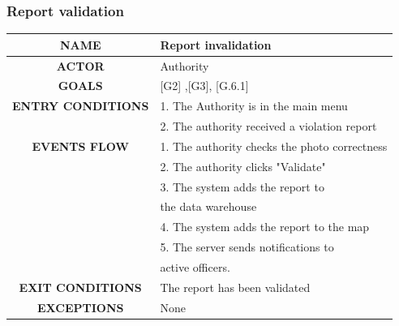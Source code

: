 \documentclass[12pt,a4paper]{article}
\begin{document}
\subsubsection{Report validation}
		\begin{center}
			\begin{tabular}{| c | l |}
				\hline
				\textbf{NAME} & Report invalidation \\
				\hline
				\textbf{ACTOR} & Authority \\
				\hline
				\textbf{GOALS} & [G2] ,[G3], [G.6.1] \\
				\hline
				\textbf{ENTRY CONDITIONS} &1. The Authority is in the main menu \\
				&2. The authority received a violation report \\ \hline
				\textbf{EVENTS FLOW}  &
				1. The authority checks the photo correctness\\
				&2. The authority clicks "Validate" \\
				&3. The system adds the report to  \\
				& the data warehouse \\
				&4. The system adds the report to the map \\ 
				&5. The server sends notifications to \\
				& active officers. \\
				\hline
				\textbf{EXIT CONDITIONS}  & The report has been validated \\ \hline
				\textbf{EXCEPTIONS} & None \\
				\hline
			\end{tabular}
		\end{center}

\newpage
\end{document}

